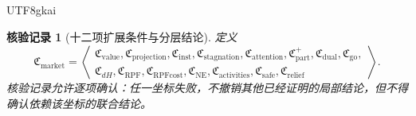 \documentclass[12pt,a4paper,openany]{report}
\newtheorem{Certificate}{核验记录}[chapter]
\begin{document}
\begin{CJK*}{UTF8}{gkai}
\begin{Certificate}[十二项扩展条件与分层结论]
定义
\[
  \mathfrak C_{\mathrm{market}}
  =
  \left\langle
  \begin{gathered}
  \mathfrak C_{\mathrm{value}},
  \mathfrak C_{\mathrm{projection}},
  \mathfrak C_{\mathrm{inst}},
  \mathfrak C_{\mathrm{stagnation}},
  \mathfrak C_{\mathrm{attention}},
  \mathfrak C_{\mathrm{part}}^+,
  \mathfrak C_{\mathrm{dual}},
  \mathfrak C_{\mathrm{go}},\\
  \mathfrak C_{dH},
  \mathfrak C_{\mathrm{RPF}},
  \mathfrak C_{\mathrm{RPFcost}},
  \mathfrak C_{\mathrm{NE}},
  \mathfrak C_{\mathrm{activities}},
  \mathfrak C_{\mathrm{safe}},
  \mathfrak C_{\mathrm{relief}}
  \end{gathered}
  \right\rangle.
\]
核验记录允许逐项确认：任一坐标失败，不撤销其他已经证明的局部结论，但不得确认依赖该坐标的联合结论。
\end{Certificate}


\end{CJK*}
\end{document}
